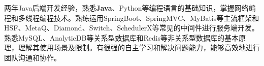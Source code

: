 \ifzh
    \onehalfspacing\hspace{2em}%

    \onehalfspacing\hspace{2em}%
    两年Java后端开发经验，熟悉\textbf{Java}、Python等编程语言的基础知识，掌握网络编程和多线程编程技术。熟练运用SpringBoot、SpringMVC、MyBatis等主流框架和HSF、MetaQ、Diamond、Switch、SchedulerX等常见的中间件进行服务端开发。熟悉MySQL、AnalyticDB等关系型数据库和Redis等非关系型数据库的基本原理，理解其使用场景及限制。有很强的自主学习和解决问题能力，能够高效地进行团队沟通和协作。
\else
\fi